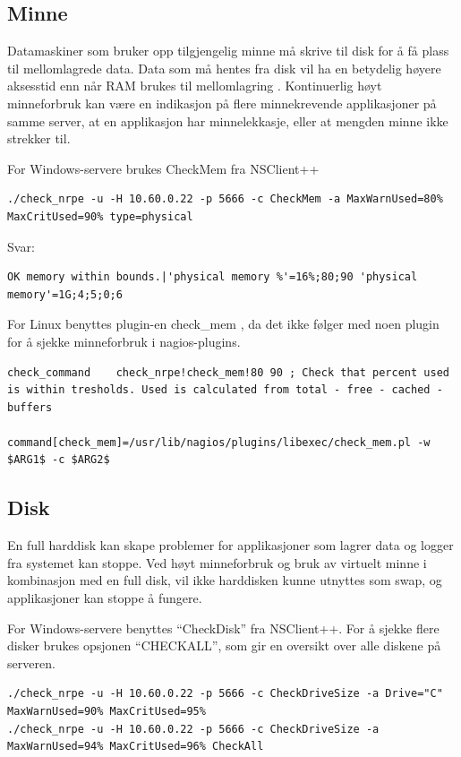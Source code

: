 \subsection{Minne}
Datamaskiner som bruker opp tilgjengelig minne må skrive til disk for å få plass til mellomlagrede data. Data som må hentes fra disk vil ha en betydelig høyere aksesstid enn når RAM brukes til mellomlagring \cite{wiki:mem}. 
Kontinuerlig høyt minneforbruk kan være en indikasjon på flere minnekrevende applikasjoner på samme server, at en applikasjon har minnelekkasje, eller at mengden minne ikke strekker til.

For Windows-servere brukes CheckMem fra NSClient++
\begin{lstlisting}[style=example]
./check_nrpe -u -H 10.60.0.22 -p 5666 -c CheckMem -a MaxWarnUsed=80% MaxCritUsed=90% type=physical
\end{lstlisting}
Svar:
\begin{lstlisting}[style=example]
OK memory within bounds.|'physical memory %'=16%;80;90 'physical memory'=1G;4;5;0;6
\end{lstlisting}

For Linux benyttes plugin-en check\_mem \cite{checklinuxmem}, da det ikke følger med noen plugin for å sjekke minneforbruk i nagios-plugins.
\begin{lstlisting}[style=example]
   check_command    check_nrpe!check_mem!80 90 ; Check that percent used is within tresholds. Used is calculated from total - free - cached - buffers 
                    command[check_mem]=/usr/lib/nagios/plugins/libexec/check_mem.pl -w $ARG1$ -c $ARG2$
\end{lstlisting}
\subsection{Disk}
En full harddisk kan skape problemer for applikasjoner som lagrer data og logger fra systemet kan stoppe. Ved høyt minneforbruk og bruk av virtuelt minne i kombinasjon med en full disk, vil ikke harddisken kunne utnyttes som swap, og applikasjoner kan stoppe å fungere.

For Windows-servere benyttes ``CheckDisk'' fra NSClient++. For å sjekke flere disker brukes opsjonen ``CHECKALL'', som gir en oversikt over alle diskene på serveren.

\begin{lstlisting}[style=example]
./check_nrpe -u -H 10.60.0.22 -p 5666 -c CheckDriveSize -a Drive="C" MaxWarnUsed=90% MaxCritUsed=95%
./check_nrpe -u -H 10.60.0.22 -p 5666 -c CheckDriveSize -a MaxWarnUsed=94% MaxCritUsed=96% CheckAll
\end{lstlisting}

